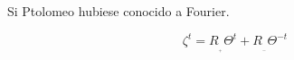 \documentclass[preview]{standalone}
\begin{document}
\begin{center}
Si Ptolomeo  hubiese conocido a Fourier.

$$\zeta ^ t=  R_{_{_+}} \Theta^{t} +R_{_{_-}} \Theta^{-t}$$
\end{center}
\end{document}
